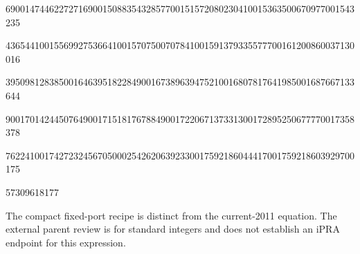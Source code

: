 \documentclass[10pt]{article}
\begin{document}
690014744622727169001508835432857700151572080230410015363500670977001543235\par
436544100155699275366410015707500707841001591379335577700161200860037130016\par
395098128385001646395182284900167389639475210016807817641985001687667133644\par
900170142445076490017151817678849001722067137331300172895250677770017358378\par
762241001742723245670500025426206392330017592186044417001759218603929700175\par
57309618177\par
\endgroup
\par\small The compact fixed-port recipe is distinct from the current-2011 equation. The external parent review is for standard integers and does not establish an iPRA endpoint for this expression.
\end{document}
